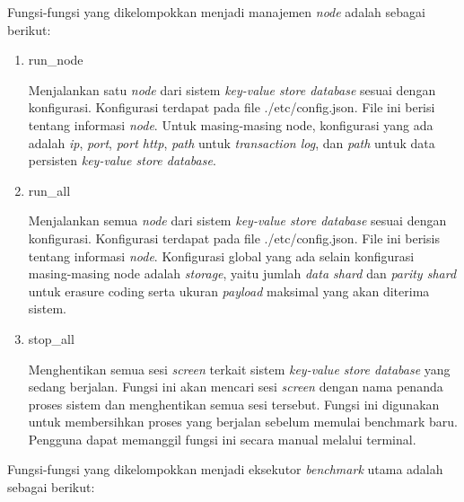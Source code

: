 Fungsi-fungsi yang dikelompokkan menjadi manajemen \textit{node} adalah sebagai berikut:

\begin{enumerate}
  \item run\_node

  Menjalankan satu \textit{node} dari sistem \textit{key-value store database} sesuai dengan konfigurasi. Konfigurasi terdapat pada file ./etc/config.json. File ini berisi tentang informasi \textit{node}. Untuk masing-masing node, konfigurasi yang ada adalah \textit{ip}, \textit{port}, \textit{port http}, \textit{path} untuk \textit{transaction log}, dan \textit{path} untuk data persisten \textit{key-value store database}.

  \item run\_all
  
  Menjalankan semua \textit{node} dari sistem \textit{key-value store database} sesuai dengan konfigurasi. Konfigurasi terdapat pada file ./etc/config.json. File ini berisis tentang informasi \textit{node}. Konfigurasi global yang ada selain konfigurasi masing-masing node adalah \textit{storage}, yaitu jumlah \textit{data shard} dan \textit{parity shard} untuk erasure coding serta ukuran \textit{payload} maksimal yang akan diterima sistem.
  
  \item stop\_all
  
  Menghentikan semua sesi \textit{screen} terkait sistem \textit{key-value store database} yang sedang berjalan. Fungsi ini akan mencari sesi \textit{screen} dengan nama penanda proses sistem dan menghentikan semua sesi tersebut. Fungsi ini digunakan untuk membersihkan proses yang berjalan sebelum memulai benchmark baru. Pengguna dapat memanggil fungsi ini secara manual melalui terminal.
\end{enumerate}


Fungsi-fungsi yang dikelompokkan menjadi eksekutor \textit{benchmark} utama adalah sebagai berikut:

